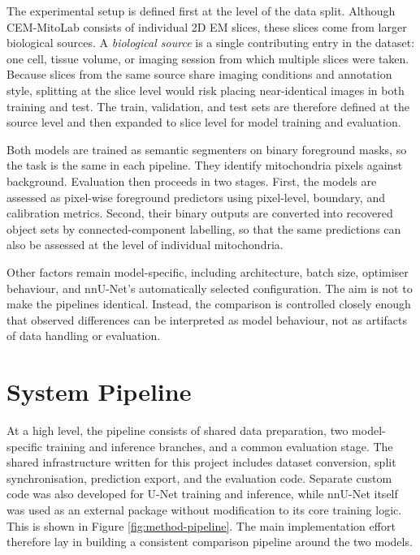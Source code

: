 \documentclass[logo,bsc,singlespacing,parskip,online]{infthesis}
\begin{document}
The experimental setup is defined first at the level of the data split. Although CEM-MitoLab consists of
individual 2D EM slices, these slices come from larger biological sources. A
\emph{biological source} is a single contributing entry in the dataset: one
cell, tissue volume, or imaging session from which multiple slices were taken.
Because slices from the same source share imaging conditions and annotation
style, splitting at the slice level would risk placing near-identical images in
both training and test. The train, validation, and test sets are therefore
defined at the source level and then expanded to slice level for model training
and evaluation.

Both models are trained as semantic segmenters on binary foreground masks, so
the task is the same in each pipeline. They identify mitochondria pixels against
background. Evaluation then proceeds in two stages. First, the models are
assessed as pixel-wise foreground predictors using pixel-level, boundary, and
calibration metrics. Second, their binary outputs are converted into recovered
object sets by connected-component labelling, so that the same predictions can
also be assessed at the level of individual mitochondria.

Other factors remain model-specific, including architecture, batch size,
optimiser behaviour, and nnU-Net's automatically selected configuration. The
aim is not to make the pipelines identical. Instead, the comparison is
controlled closely enough that observed differences can be interpreted as model
behaviour, not as artifacts of data handling or evaluation.

\section{System Pipeline}

At a high level, the pipeline consists of shared data preparation, two model-specific 
training and inference branches, and a common evaluation stage. The shared infrastructure 
written for this project includes dataset conversion, split synchronisation, prediction export, 
and the evaluation code. Separate custom code was also developed for U-Net training and inference, 
while nnU-Net itself was used as an external package without modification to its core training logic. 
This is shown in Figure \ref{fig:method-pipeline}. The main implementation effort therefore lay in building a consistent comparison pipeline around 
the two models.
\end{document}
